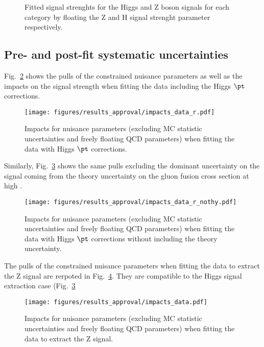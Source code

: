\begin{figure}[hbtp]
\centering
{}
 \caption{Fitted signal strenghts for the Higgs and Z boson signals for each \pt category by floating the Z and H signal strenght parameter respectively.}
        \label{fig:fitch2}
 \end{figure}

\clearpage
\subsection{Pre- and post-fit systematic uncertainties}


Fig.~\ref{fig:impacts} shows the pulls of the constrained nuisance parameters as well as the impacts on the signal
strength when fitting the data including the Higgs $\pt$ corrections.

\begin{figure}[h!]
\centering
\texttt{[image: figures/results\_approval/impacts\_data\_r.pdf]}
	\caption{Impacts for nuisance parameters (excluding MC
          statistic uncertainties and freely floating QCD parameters) when fitting the data with Higgs $\pt$ corrections.
	\label{fig:impacts}}
 \end{figure}

Similarly, Fig.~\ref{fig:impactsnoHpt} shows the same pulls excluding
the dominant uncertainty on the signal coming from the theory uncertainty on the gluon fusion cross section at high \pt. 

\begin{figure}[h!]
\centering
\texttt{[image: figures/results\_approval/impacts\_data\_r\_nothy.pdf]}
        \caption{Impacts for nuisance parameters (excluding MC
          statistic uncertainties and freely floating QCD parameters) when fitting the data with Higgs $\pt$ corrections without including the theory uncertainty.
        \label{fig:impactsnoHpt}}
 \end{figure}

The pulls of the constrained nuisance parameters when fitting the data to extract the Z signal are rerpoted in Fig.~\ref{fig:impactsZ}. They are compatible to the Higgs signal extraction case (Fig.~\ref{fig:impactsnoHpt}

\begin{figure}[h!]
\centering
\texttt{[image: figures/results\_approval/impacts\_data.pdf]}
        \caption{Impacts for nuisance parameters (excluding MC
          statistic uncertainties and freely floating QCD parameters) when fitting the data to extract the Z signal. 
        \label{fig:impactsZ}}
 \end{figure}

\clearpage
